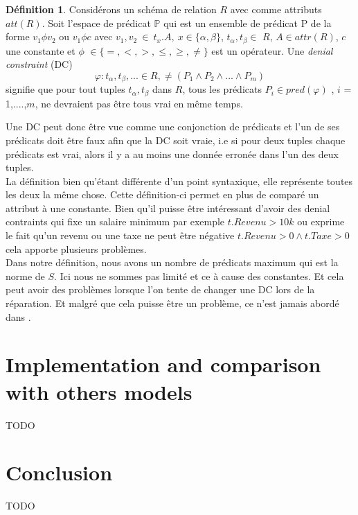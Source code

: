 \documentclass[letterpaper, 12pt]{report}
\theoremstyle{definition}
\newtheorem{mydef}{Définition}
\begin{document}
\begin{mydef}
	Considérons un schéma de relation $R$ avec comme attributs $att(R)$. Soit l'espace de prédicat $\mathbb{P}$ qui est un ensemble de prédicat P de la forme $v_1 \phi v_2$ ou $v_1 \phi c$ avec $v_1,v_2\ \in \ t_x.A,\ x \in \{\alpha,\beta \}$, $t_\alpha,t_\beta \in$ $R$, $A \in attr(R)$, $c$ une constante et $\phi$ $\in \{=,<,>,\leq,\geq,\neq \} $ est un opérateur. Une \emph{denial constraint} (DC)
	$$ \varphi : t_\alpha,t_\beta,... \in R,\neq(P_1 \wedge P_2 \wedge ... \wedge P_m)$$
	signifie que pour tout tuples $t_\alpha,t_\beta$ dans $R$, tous les prédicats $P_i \in pred (\varphi)$ , $i$ = 1,....,$m$, ne devraient pas être tous vrai en même temps. 
\end{mydef}

Une DC peut donc être vue comme une conjonction de prédicats et l'un de ses prédicats doit être faux afin que la DC soit vraie, i.e si pour deux tuples chaque prédicats est vrai, alors il y a au moins une donnée erronée dans l'un des deux tuples.\\

La définition bien qu'étant différente d'un point syntaxique, elle représente toutes les deux la même chose. Cette définition-ci permet en plus de comparé un attribut à une constante. Bien qu'il puisse être intéressant d'avoir des denial contraints qui fixe un salaire minimum par exemple $t.Revenu > 10k$ ou exprime le fait qu'un revenu ou une taxe ne peut être négative $t.Revenu >0 \wedge t.Taxe >0$ cela apporte plusieurs problèmes.\\

Dans notre définition, nous avons un nombre de prédicats maximum qui est la norme de $S$. Ici nous ne sommes pas limité et ce à cause des constantes. Et cela peut avoir des problèmes lorsque l'on tente de changer une DC lors de la réparation. Et malgré que cela puisse être un problème, ce n'est jamais abordé dans \cite{main}.

\chapter{Implementation and comparison with others models}
TODO
\chapter{Conclusion}
TODO






\newpage
\appendix
\end{document}
